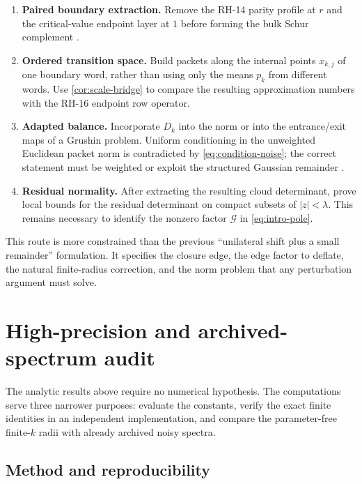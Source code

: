 \documentclass[11pt]{article}
\theoremstyle{definition}
\theoremstyle{remark}
\newcommand{\cG}{\mathcal G}
\begin{document}
\begin{enumerate}[label=\textbf{G\arabic*.},leftmargin=3.1em]
 \item \textbf{Paired boundary extraction.}
 Remove the RH-14 parity profile at $r$ and the critical-value endpoint layer
 at $1$ before forming the bulk Schur complement
 \citep{WangBoundaryLayer2026}.

 \item \textbf{Ordered transition space.}
 Build packets along the internal points $x_{k,j}$ of one boundary word,
 rather than using only the means $p_k$ from different words.  Use
 \cref{cor:scale-bridge} to compare the resulting approximation numbers with
 the RH-16 endpoint row operator.

 \item \textbf{Adapted balance.}
 Incorporate $D_k$ into the norm or into the entrance/exit maps of a Grushin
 problem.  Uniform conditioning in the unweighted Euclidean packet norm is
 contradicted by \eqref{eq:condition-noise}; the correct statement must be
 weighted or exploit the structured Gaussian remainder
 \citep{SjoestrandZworski2007}.

 \item \textbf{Residual normality.}
 After extracting the resulting cloud determinant, prove local bounds for the
 residual determinant on compact subsets of $|z|<\lambda$.  This remains
 necessary to identify the nonzero factor $\cG$ in
 \eqref{eq:intro-pole}.
\end{enumerate}

This route is more constrained than the previous ``unilateral shift plus a
small remainder'' formulation.  It specifies the closure edge, the edge
factor to deflate, the natural finite-radius correction, and the norm problem
that any perturbation argument must solve.

\section{High-precision and archived-spectrum audit}
\label{sec:numerics}

The analytic results above require no numerical hypothesis.  The computations
serve three narrower purposes: evaluate the constants, verify the exact
finite identities in an independent implementation, and compare the
parameter-free finite-$k$ radii with already archived noisy spectra.

\subsection{Method and reproducibility}
\end{document}
